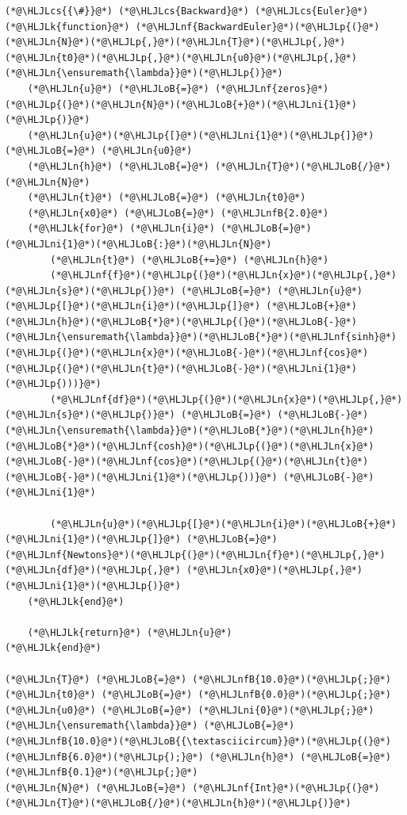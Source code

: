 \documentclass[12pt,a4paper]{article}
\newcommand{\HLJLk}[1]{\textcolor[RGB]{148,91,176}{\textbf{#1}}}
\newcommand{\HLJLn}[1]{#1}
\newcommand{\HLJLnf}[1]{\textcolor[RGB]{66,102,213}{#1}}
\newcommand{\HLJLnfB}[1]{\textcolor[RGB]{59,151,46}{#1}}
\newcommand{\HLJLni}[1]{\textcolor[RGB]{59,151,46}{#1}}
\newcommand{\HLJLoB}[1]{\textcolor[RGB]{102,102,102}{\textbf{#1}}}
\newcommand{\HLJLp}[1]{#1}
\newcommand{\HLJLcs}[1]{\textcolor[RGB]{153,153,119}{\textit{#1}}}
\begin{document}
\begin{lstlisting}
(*@\HLJLcs{{\#}}@*) (*@\HLJLcs{Backward}@*) (*@\HLJLcs{Euler}@*)
(*@\HLJLk{function}@*) (*@\HLJLnf{BackwardEuler}@*)(*@\HLJLp{(}@*)(*@\HLJLn{N}@*)(*@\HLJLp{,}@*)(*@\HLJLn{T}@*)(*@\HLJLp{,}@*)(*@\HLJLn{t0}@*)(*@\HLJLp{,}@*)(*@\HLJLn{u0}@*)(*@\HLJLp{,}@*)(*@\HLJLn{\ensuremath{\lambda}}@*)(*@\HLJLp{)}@*)
    (*@\HLJLn{u}@*) (*@\HLJLoB{=}@*) (*@\HLJLnf{zeros}@*)(*@\HLJLp{(}@*)(*@\HLJLn{N}@*)(*@\HLJLoB{+}@*)(*@\HLJLni{1}@*)(*@\HLJLp{)}@*)
    (*@\HLJLn{u}@*)(*@\HLJLp{[}@*)(*@\HLJLni{1}@*)(*@\HLJLp{]}@*) (*@\HLJLoB{=}@*) (*@\HLJLn{u0}@*)
    (*@\HLJLn{h}@*) (*@\HLJLoB{=}@*) (*@\HLJLn{T}@*)(*@\HLJLoB{/}@*)(*@\HLJLn{N}@*)
    (*@\HLJLn{t}@*) (*@\HLJLoB{=}@*) (*@\HLJLn{t0}@*)
    (*@\HLJLn{x0}@*) (*@\HLJLoB{=}@*) (*@\HLJLnfB{2.0}@*)
    (*@\HLJLk{for}@*) (*@\HLJLn{i}@*) (*@\HLJLoB{=}@*) (*@\HLJLni{1}@*)(*@\HLJLoB{:}@*)(*@\HLJLn{N}@*)
        (*@\HLJLn{t}@*) (*@\HLJLoB{+=}@*) (*@\HLJLn{h}@*)
        (*@\HLJLnf{f}@*)(*@\HLJLp{(}@*)(*@\HLJLn{x}@*)(*@\HLJLp{,}@*) (*@\HLJLn{s}@*)(*@\HLJLp{)}@*) (*@\HLJLoB{=}@*) (*@\HLJLn{u}@*)(*@\HLJLp{[}@*)(*@\HLJLn{i}@*)(*@\HLJLp{]}@*) (*@\HLJLoB{+}@*) (*@\HLJLn{h}@*)(*@\HLJLoB{*}@*)(*@\HLJLp{(}@*)(*@\HLJLoB{-}@*)(*@\HLJLn{\ensuremath{\lambda}}@*)(*@\HLJLoB{*}@*)(*@\HLJLnf{sinh}@*)(*@\HLJLp{(}@*)(*@\HLJLn{x}@*)(*@\HLJLoB{-}@*)(*@\HLJLnf{cos}@*)(*@\HLJLp{(}@*)(*@\HLJLn{t}@*)(*@\HLJLoB{-}@*)(*@\HLJLni{1}@*)(*@\HLJLp{)))}@*)
        (*@\HLJLnf{df}@*)(*@\HLJLp{(}@*)(*@\HLJLn{x}@*)(*@\HLJLp{,}@*)(*@\HLJLn{s}@*)(*@\HLJLp{)}@*) (*@\HLJLoB{=}@*) (*@\HLJLoB{-}@*)(*@\HLJLn{\ensuremath{\lambda}}@*)(*@\HLJLoB{*}@*)(*@\HLJLn{h}@*)(*@\HLJLoB{*}@*)(*@\HLJLnf{cosh}@*)(*@\HLJLp{(}@*)(*@\HLJLn{x}@*)(*@\HLJLoB{-}@*)(*@\HLJLnf{cos}@*)(*@\HLJLp{(}@*)(*@\HLJLn{t}@*)(*@\HLJLoB{-}@*)(*@\HLJLni{1}@*)(*@\HLJLp{))}@*) (*@\HLJLoB{-}@*) (*@\HLJLni{1}@*)

        (*@\HLJLn{u}@*)(*@\HLJLp{[}@*)(*@\HLJLn{i}@*)(*@\HLJLoB{+}@*)(*@\HLJLni{1}@*)(*@\HLJLp{]}@*) (*@\HLJLoB{=}@*) (*@\HLJLnf{Newtons}@*)(*@\HLJLp{(}@*)(*@\HLJLn{f}@*)(*@\HLJLp{,}@*) (*@\HLJLn{df}@*)(*@\HLJLp{,}@*) (*@\HLJLn{x0}@*)(*@\HLJLp{,}@*) (*@\HLJLni{1}@*)(*@\HLJLp{)}@*)
    (*@\HLJLk{end}@*)

    (*@\HLJLk{return}@*) (*@\HLJLn{u}@*)
(*@\HLJLk{end}@*)

(*@\HLJLn{T}@*) (*@\HLJLoB{=}@*) (*@\HLJLnfB{10.0}@*)(*@\HLJLp{;}@*) (*@\HLJLn{t0}@*) (*@\HLJLoB{=}@*) (*@\HLJLnfB{0.0}@*)(*@\HLJLp{;}@*) (*@\HLJLn{u0}@*) (*@\HLJLoB{=}@*) (*@\HLJLni{0}@*)(*@\HLJLp{;}@*) (*@\HLJLn{\ensuremath{\lambda}}@*) (*@\HLJLoB{=}@*) (*@\HLJLnfB{10.0}@*)(*@\HLJLoB{{\textasciicircum}}@*)(*@\HLJLp{(}@*)(*@\HLJLnfB{6.0}@*)(*@\HLJLp{);}@*) (*@\HLJLn{h}@*) (*@\HLJLoB{=}@*) (*@\HLJLnfB{0.1}@*)(*@\HLJLp{;}@*)
(*@\HLJLn{N}@*) (*@\HLJLoB{=}@*) (*@\HLJLnf{Int}@*)(*@\HLJLp{(}@*)(*@\HLJLn{T}@*)(*@\HLJLoB{/}@*)(*@\HLJLn{h}@*)(*@\HLJLp{)}@*)


\end{lstlisting}
\end{document}
